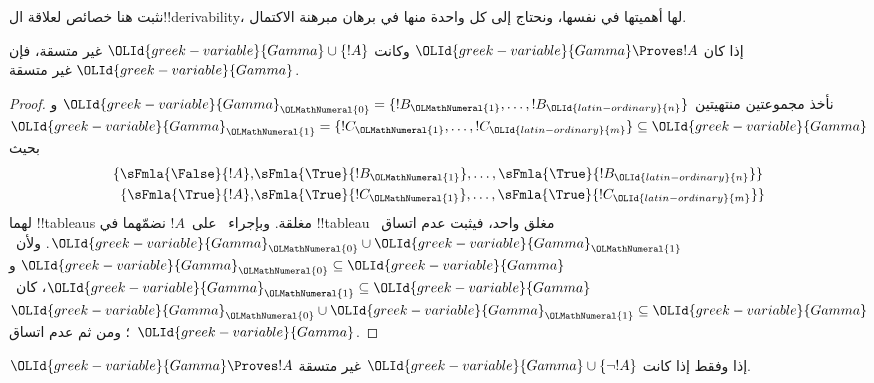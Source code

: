 \documentclass[../../../include/open-logic-section]{subfiles}
\begin{document}
      {}
      {}


نثبت هنا خصائص لعلاقة ال!!{derivability}، لها أهميتها في نفسها،
ونحتاج إلى كل واحدة منها في برهان مبرهنة الاكتمال.


\begin{prop}
  إذا كان ${\OLId{greek-variable}{Gamma}} \Proves !A$ وكانت ${\OLId{greek-variable}{Gamma}} \cup \{!A\}$ غير متسقة،
  فإن ${\OLId{greek-variable}{Gamma}}$ غير متسقة.
\end{prop}

\begin{proof}
نأخذ مجموعتين منتهيتين ${\OLId{greek-variable}{Gamma}}_{\OLMathNumeral{0}} = \{!B_{\OLMathNumeral{1}}, \dots, !B_{\OLId{latin-ordinary}{n}}\}$ و${\OLId{greek-variable}{Gamma}}_{\OLMathNumeral{1}}
  =\{!C_{\OLMathNumeral{1}}, \dots, !C_{\OLId{latin-ordinary}{m}}\} \subseteq {\OLId{greek-variable}{Gamma}}$ بحيث
  \begin{align*}
    \{\sFmla{\False}{!A}, &
    \sFmla{\True}{!B_{\OLMathNumeral{1}}}, \dots, \sFmla{\True}{!B_{\OLId{latin-ordinary}{n}}}\} \\
    \{\sFmla{\True}{!A}, &
    \sFmla{\True}{!C_{\OLMathNumeral{1}}}, \dots, \sFmla{\True}{!C_{\OLId{latin-ordinary}{m}}}\}
  \end{align*}
  لهما !!{tableau}s مغلقة. وبإجراء~\Cut{} على~$!A$ نضمّهما
  في !!{tableau} مغلق واحد، فيثبت عدم اتساق~${\OLId{greek-variable}{Gamma}}_{\OLMathNumeral{0}}
  \cup {\OLId{greek-variable}{Gamma}}_{\OLMathNumeral{1}}$. ولأن~${\OLId{greek-variable}{Gamma}}_{\OLMathNumeral{0}}
  \subseteq {\OLId{greek-variable}{Gamma}}$ و${\OLId{greek-variable}{Gamma}}_{\OLMathNumeral{1}} \subseteq {\OLId{greek-variable}{Gamma}}$، كان~${\OLId{greek-variable}{Gamma}}_{\OLMathNumeral{0}} \cup
  {\OLId{greek-variable}{Gamma}}_{\OLMathNumeral{1}} \subseteq {\OLId{greek-variable}{Gamma}}$؛ ومن ثم عدم اتساق~${\OLId{greek-variable}{Gamma}}$.
\end{proof}

\begin{prop}
${\OLId{greek-variable}{Gamma}} \Proves !A$ إذا وفقط إذا كانت ${\OLId{greek-variable}{Gamma}} \cup \{\lnot !A\}$ غير متسقة.
\end{prop}
\end{document}
